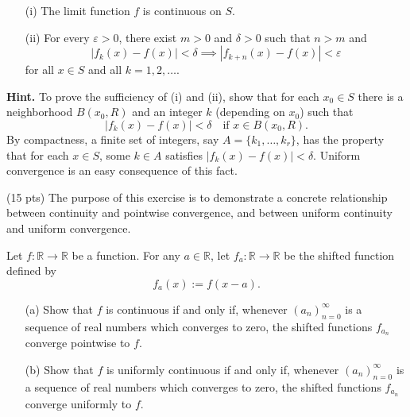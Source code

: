 \documentclass[addpoints]{exam}
\theoremstyle{definition}
\begin{document}
\begin{CJK*}{UTF8}{gbsn}
\begin{questions}
\begin{enumerate}
  \item[(i)] The limit function $f$ is continuous on $S$.
  \item[(ii)] For every $\varepsilon > 0$, there exist $m > 0$ and $\delta > 0$ such that $n > m$ and 
  \[
  |f_k(x) - f(x)| < \delta \implies |f_{k+n}(x) - f(x)| < \varepsilon
  \]
  for all $x \in S$ and all $k = 1, 2, \dots$.
\end{enumerate}

\noindent\textbf{Hint.} To prove the sufficiency of (i) and (ii), show that for each $x_0 \in S$ there is a neighborhood $B(x_0, R)$ and an integer $k$ (depending on $x_0$) such that
\[
|f_k(x) - f(x)| < \delta \quad \text{if } x \in B(x_0,R).
\]
By compactness, a finite set of integers, say $A = \{k_1, \dots, k_r\}$, has the property that for each $x \in S$, some $k \in A$ satisfies $|f_k(x) - f(x)| < \delta$.  
Uniform convergence is an easy consequence of this fact.


 

\begin{solution} 

\end{solution}

\question (15 pts) 
The purpose of this exercise is to demonstrate a concrete relationship between continuity and pointwise convergence, and between uniform continuity and uniform convergence. 

Let $f:\mathbb{R} \to \mathbb{R}$ be a function. For any $a \in \mathbb{R}$, let $f_a : \mathbb{R} \to \mathbb{R}$ be the shifted function defined by
\[
f_a(x) := f(x - a).
\]

\begin{enumerate}
  \item[(a)] Show that $f$ is continuous if and only if, whenever $(a_n)_{n=0}^\infty$ is a sequence of real numbers which converges to zero, the shifted functions $f_{a_n}$ converge pointwise to $f$.

  \item[(b)] Show that $f$ is uniformly continuous if and only if, whenever $(a_n)_{n=0}^\infty$ is a sequence of real numbers which converges to zero, the shifted functions $f_{a_n}$ converge uniformly to $f$.
\end{enumerate}


\begin{solution} 
\end{solution}

\end{questions}


\end{CJK*}
\end{document}
